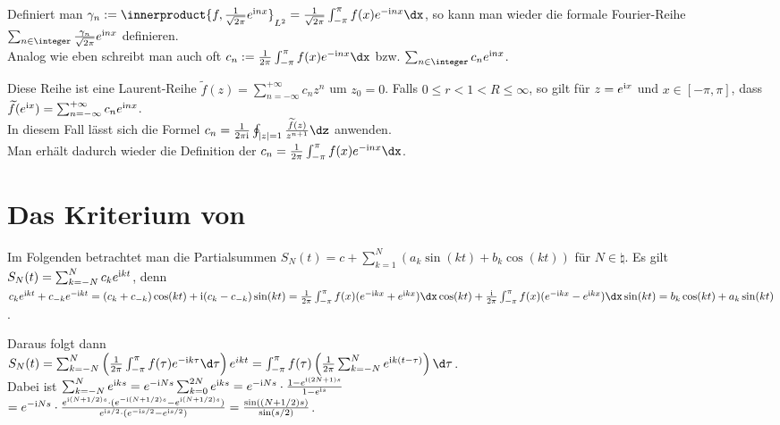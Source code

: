 Definiert man
$\gamma_n := \innerproduct{f, \frac{1}{\sqrt{2\pi}} e^{\i nx}}_{L^2} =
\frac{1}{\sqrt{2\pi}} \int_{-\pi}^\pi f(x) e^{-\i nx}\dx$, so kann man wieder
die formale Fourier-Reihe
$\sum_{n \in \integer} \frac{\gamma_n}{\sqrt{2\pi}} e^{\i nx}$ definieren.\\
Analog wie eben schreibt man auch oft
$c_n := \frac{1}{2\pi} \int_{-\pi}^\pi f(x) e^{-\i nx} \dx$ bzw.
$\sum_{n \in \integer} c_n e^{\i nx}$.

\linie

Diese Reihe ist eine Laurent-Reihe
$\widetilde{f}(z) = \sum_{n=-\infty}^{+\infty} c_n z^n$ um $z_0 = 0$.
Falls $0 \le r < 1 < R \le \infty$, so gilt für $z = e^{\mathrm{i} x}$ und
$x \in [-\pi, \pi]$, dass
$\widetilde{f}(e^{\mathrm{i} x}) = \sum_{n=-\infty}^{+\infty} c_n e^{\mathrm{i} nx}$.\\
In diesem Fall lässt sich die Formel
$c_n = \frac{1}{2\pi\i} \oint_{|z| = 1} \frac{\widetilde{f}(z)}{z^{n+1}}\dz$
anwenden.\\
Man erhält dadurch wieder die Definition der
$c_n = \frac{1}{2\pi} \int_{-\pi}^\pi f(x) e^{-\i nx} \dx$.

\section{%
    Das Kriterium von %
}

Im Folgenden betrachtet man die Partialsummen
$S_N(t) = c + \sum_{k=1}^N (a_k \sin(kt) + b_k \cos(kt))$ für $N \in \natural$.
Es gilt
$S_N(t) = \sum_{k=-N}^N c_k e^{\mathrm{i} kt}$,
denn\\
$c_k e^{\i kt} + c_{-k} e^{-\i kt} =
(c_k + c_{-k}) \cos(kt) + \i (c_k - c_{-k}) \sin(kt) =
\frac{1}{2\pi} \int_{-\pi}^\pi f(x) (e^{-\i kx} + e^{\i kx}) \dx \cos(kt) +
\frac{\i}{2\pi} \int_{-\pi}^\pi f(x) (e^{-\i kx} - e^{\i kx}) \dx \sin(kt) =
b_k \cos(kt) + a_k \sin(kt)$.

Daraus folgt dann\\
$S_N(t) = \sum_{k=-N}^N \left(\frac{1}{2\pi}
\int_{-\pi}^{\pi} f(\tau) e^{-\i k\tau}\d\tau\right) e^{ikt}
= \int_{-\pi}^{\pi} f(\tau)
\left(\frac{1}{2\pi} \sum_{k=-N}^N e^{\i k(t - \tau)}\right)\d\tau$.\\
Dabei ist
$\sum_{k=-N}^N e^{\mathrm{i} ks} =
e^{-\mathrm{i} Ns} \sum_{k=0}^{2N} e^{\mathrm{i} ks} =
e^{-\mathrm{i} Ns} \cdot
\frac{1 - e^{\mathrm{i} (2N + 1)s}}{1 - e^{\mathrm{i} s}}$\\
$= e^{-\mathrm{i} Ns} \cdot
\frac{e^{\mathrm{i} (N + 1/2)s} \cdot
(e^{-\mathrm{i} (N + 1/2)s} - e^{\mathrm{i} (N + 1/2)s})}
{e^{\mathrm{i} s/2} \cdot (e^{-\mathrm{i} s/2} - e^{\mathrm{i} s/2})} =
\frac{\sin((N + 1/2) s)}{\sin(s/2)}$.

